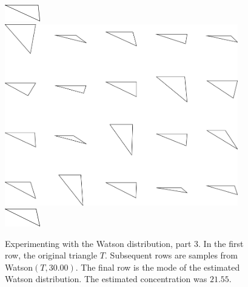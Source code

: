 \begin{figure}
\includegraphics[width=0.6in]{output/1.models/test_watson/watson_3_true.png}\\ 
\includegraphics[width=4in]{output/1.models/test_watson/watson_3_samples.png}\\ 
\includegraphics[width=0.6in]{output/1.models/test_watson/watson_3_est.png}
\caption{Experimenting with the Watson distribution, part 3. In the first row, the original triangle $T$. Subsequent rows are samples from Watson$(T,30.00)$. The final row is the mode of the estimated Watson distribution. The estimated concentration was $21.55$.}
\label{fig-watson-3}
\end{figure}

